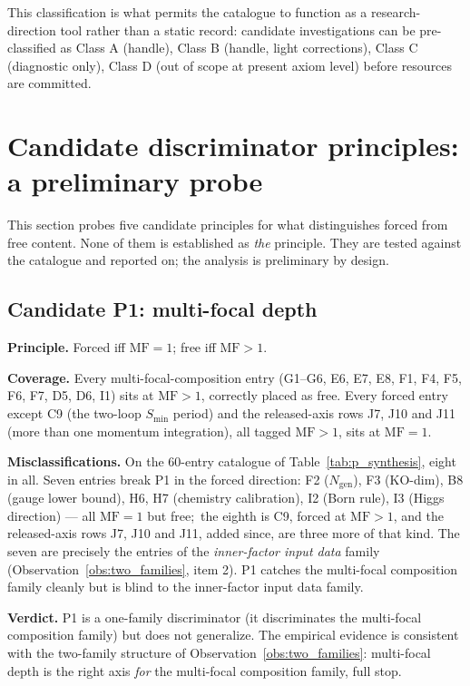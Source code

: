 \documentclass[11pt,a4paper]{article}
\theoremstyle{plain}
\theoremstyle{definition}
\newcommand{\Ngen}{N_{\mathrm{gen}}}
\begin{document}
This classification is what permits the catalogue to function as a research-direction tool rather than a static record:  candidate investigations can be pre-classified as Class A (handle), Class B (handle, light corrections), Class C (diagnostic only), Class D (out of scope at present axiom level) before resources are committed.

\section{Candidate discriminator principles: a preliminary probe}
\label{sec:principles}

This section probes five candidate principles for what distinguishes forced from free content. None of them is established as \emph{the} principle. They are tested against the catalogue and reported on; the analysis is preliminary by design.

\subsection{Candidate P1:  multi-focal depth}
\label{sec:p1}

\textbf{Principle.}  Forced iff $\mathrm{MF} = 1$; free iff $\mathrm{MF} > 1$.

\textbf{Coverage.}  Every multi-focal-composition entry (G1--G6, E6, E7, E8, F1, F4, F5, F6, F7, D5, D6, I1) sits at $\mathrm{MF} > 1$, correctly placed as free. Every forced entry except C9 (the two-loop $S_{\min}$ period) and the released-axis rows J7, J10 and J11 (more than one momentum integration), all tagged $\mathrm{MF} > 1$, sits at $\mathrm{MF} = 1$.

\textbf{Misclassifications.}  On the 60-entry catalogue of Table~\ref{tab:p_synthesis}, eight in all.  Seven entries break P1 in the forced direction: F2 ($\Ngen$), F3 (KO-dim), B8 (gauge lower bound), H6, H7 (chemistry calibration), I2 (Born rule), I3 (Higgs direction) --- all $\mathrm{MF} = 1$ but free;\ the eighth is C9, forced at $\mathrm{MF} > 1$, and the released-axis rows J7, J10 and J11, added since, are three more of that kind. The seven are precisely the entries of the \emph{inner-factor input data} family (Observation~\ref{obs:two_families}, item 2). P1 catches the multi-focal composition family cleanly but is blind to the inner-factor input data family.

\textbf{Verdict.}  P1 is a one-family discriminator (it discriminates the multi-focal composition family) but does not generalize. The empirical evidence is consistent with the two-family structure of Observation~\ref{obs:two_families}: multi-focal depth is the right axis \emph{for} the multi-focal composition family, full stop.
\end{document}
